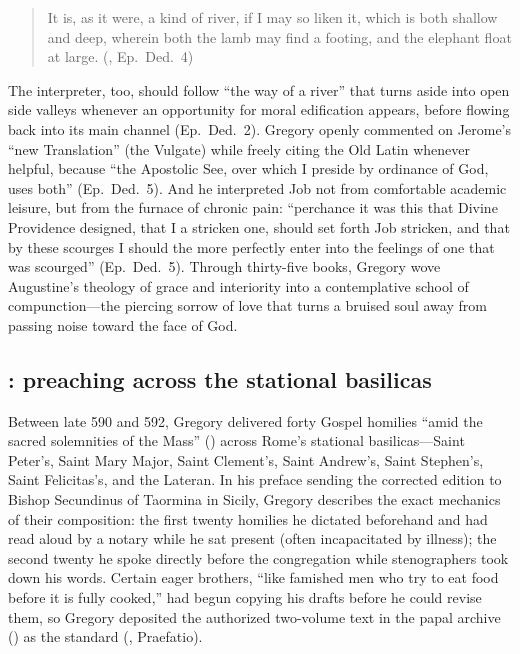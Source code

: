 \begin{quote}
It is, as it were, a kind of river, if I may so liken it, which is both
shallow and deep, wherein both the lamb may find a footing, and the elephant
float at large. (, Ep.\ Ded.\ 4)
\end{quote}

The interpreter, too, should follow ``the way of a river'' that turns aside
into open side valleys whenever an opportunity for moral edification appears,
before flowing back into its main channel (Ep.\ Ded.\ 2). Gregory openly
commented on Jerome's ``new Translation'' (the Vulgate) while freely citing the
Old Latin whenever helpful, because ``the Apostolic See, over which I preside
by ordinance of God, uses both'' (Ep.\ Ded.\ 5). And he interpreted Job not
from comfortable academic leisure, but from the furnace of chronic pain:
``perchance it was this that Divine Providence designed, that I a stricken one,
should set forth Job stricken, and that by these scourges I should the more
perfectly enter into the feelings of one that was scourged'' (Ep.\ Ded.\ 5).
Through thirty-five books, Gregory wove Augustine's theology of grace and
interiority into a contemplative school of compunction---the piercing sorrow
of love that turns a bruised soul away from passing noise toward the face of
God.

\subsection{: preaching across the stational basilicas}

Between late 590 and 592, Gregory delivered forty Gospel homilies ``amid the
sacred solemnities of the Mass'' () across
Rome's stational basilicas---Saint Peter's, Saint Mary Major, Saint Clement's,
Saint Andrew's, Saint Stephen's, Saint Felicitas's, and the Lateran. In his
preface sending the corrected edition to Bishop Secundinus of Taormina in
Sicily, Gregory describes the exact mechanics of their composition: the first
twenty homilies he dictated beforehand and had read aloud by a notary while he
sat present (often incapacitated by illness); the second twenty he spoke
directly before the congregation while stenographers took down his words.
Certain eager brothers, ``like famished men who try to eat food before it is
fully cooked,'' had begun copying his drafts before he could revise them, so
Gregory deposited the authorized two-volume text in the papal archive
() as the standard (, Praefatio).

